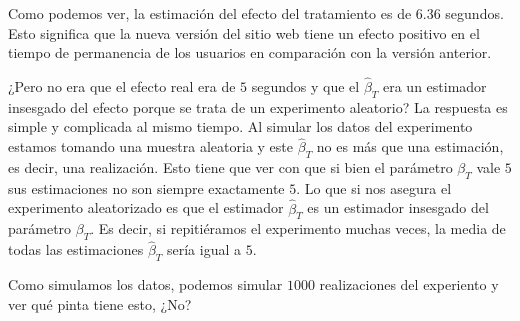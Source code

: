 \documentclass[
  letterpaper,
  DIV=11,
  numbers=noendperiod,
  oneside]{scrreprt}
\begin{document}
Como podemos ver, la estimación del efecto del tratamiento es de 6.36
segundos. Esto significa que la nueva versión del sitio web tiene un
efecto positivo en el tiempo de permanencia de los usuarios en
comparación con la versión anterior.

¿Pero no era que el efecto real era de \(5\) segundos y que el
\(\hat\beta_T\) era un estimador insesgado del efecto porque se trata de
un experimento aleatorio? La respuesta es simple y complicada al mismo tiempo. Al
simular los datos del experimento estamos tomando una muestra aleatoria
y este \(\hat\beta_T\) no es más que una estimación, es decir, una
realización. Esto tiene que ver con que si bien el parámetro \(\beta_T\)
vale \(5\) sus estimaciones no son siempre exactamente \(5\). Lo que si
nos asegura el experimento aleatorizado es que el estimador
\(\hat\beta_T\) es un estimador insesgado del parámetro \(\beta_T\). Es
decir, si repitiéramos el experimento muchas veces, la media de todas
las estimaciones \(\hat\beta_T\) sería igual a \(5\).

Como simulamos los datos, podemos simular \(1000\) realizaciones del
experiento y ver qué pinta tiene esto, ¿No?
\end{document}
